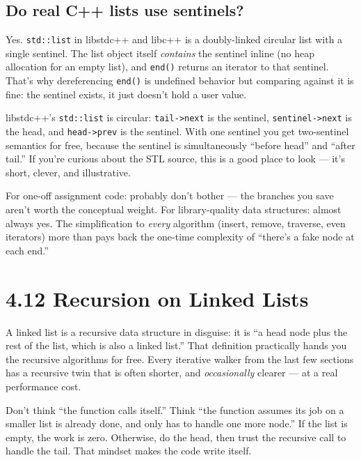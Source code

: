 \documentclass[11pt]{article}
\begin{document}
\subsection*{Do real C++ lists use sentinels?}

Yes. \texttt{std::list} in libstdc++ and libc++ is a doubly-linked
circular list with a single sentinel. The list object itself
\emph{contains} the sentinel inline (no heap allocation for
an empty list), and \texttt{end()} returns an iterator to that
sentinel. That's why dereferencing \texttt{end()} is undefined
behavior but comparing against it is fine: the sentinel exists,
it just doesn't hold a user value.

\begin{notebox}[Circular + sentinel = extremely clean]
libstdc++'s \texttt{std::list} is circular: \texttt{tail->next} is
the sentinel, \texttt{sentinel->next} is the head, and
\texttt{head->prev} is the sentinel. With one sentinel you get
two-sentinel semantics for free, because the sentinel is
simultaneously ``before head'' and ``after tail.'' If you're
curious about the STL source, this is a good place to look ---
it's short, clever, and illustrative.
\end{notebox}

\begin{ideabox}
For one-off assignment code: probably don't bother --- the
branches you save aren't worth the conceptual weight. For
library-quality data structures: almost always yes. The
simplification to \emph{every} algorithm (insert, remove,
traverse, even iterators) more than pays back the one-time
complexity of ``there's a fake node at each end.''
\end{ideabox}

\section{4.12 Recursion on Linked Lists}

A linked list is a recursive data structure in disguise: it is
``a head node plus the rest of the list, which is also a linked
list.'' That definition practically hands you the recursive
algorithms for free. Every iterative walker from the last few
sections has a recursive twin that is often shorter, and
\emph{occasionally} clearer --- at a real performance cost.

\begin{ideabox}
Don't think ``the function calls itself.'' Think ``the function
assumes its job on a smaller list is already done, and only has
to handle one more node.'' If the list is empty, the work is
zero. Otherwise, do the head, then trust the recursive call to
handle the tail. That mindset makes the code write itself.
\end{ideabox}
\end{document}
